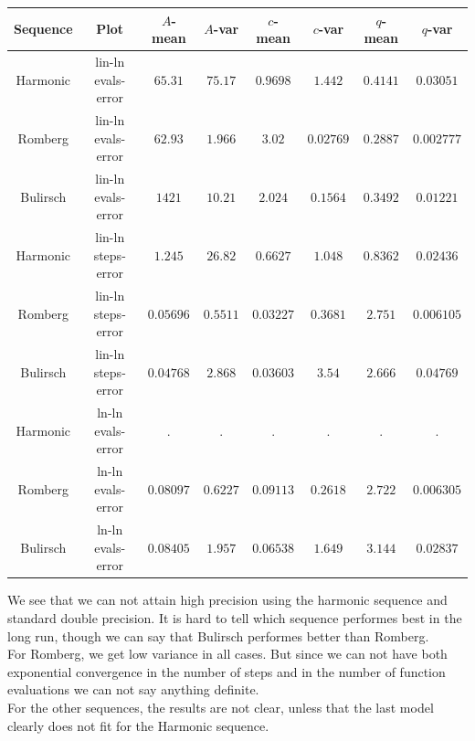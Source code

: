 \begin{table}[H]
    \centering
    \small
    \begin{tabular}{c|c||c|c|c|c|c	|c}
Sequence & Plot & \(A\)-mean & \(A\)-var & \(c\)-mean & \(c\)-var & \(q\)-mean & \(q\)-var\\\hline
Harmonic & lin-ln evals-error & \(65.31\) & \(75.17\) & \(0.9698\) & \(1.442\) & \(0.4141\) & \(0.03051\) \\
Romberg & lin-ln evals-error & \(62.93\) & \(1.966\) & \(3.02\) & \(0.02769\) & \(0.2887\) & \(0.002777\) \\
Bulirsch & lin-ln evals-error & \(1421\) & \(10.21\) & \(2.024\) & \(0.1564\) & \(0.3492\) & \(0.01221\) \\
Harmonic & lin-ln steps-error & \(1.245\) & \(26.82\) & \(0.6627\) & \(1.048\) & \(0.8362\) & \(0.02436\) \\
Romberg & lin-ln steps-error & \(0.05696\) & \(0.5511\) & \(0.03227\) & \(0.3681\) & \(2.751\) & \(0.006105\) \\
Bulirsch & lin-ln steps-error & \(0.04768\) & \(2.868\) & \(0.03603\) & \(3.54\) & \(2.666\) & \(0.04769\) \\
Harmonic & ln-ln evals-error & . & . & . & . & . & . \\
Romberg & ln-ln evals-error & \(0.08097\) & \(0.6227\) & \(0.09113\) & \(0.2618\) & \(2.722\) & \(0.006305\) \\
Bulirsch & ln-ln evals-error & \(0.08405\) & \(1.957\) & \(0.06538\) & \(1.649\) & \(3.144\) & \(0.02837\) \\
    \end{tabular}
    \label{tab:my_label}
\end{table}

We see that we can not attain high precision using the harmonic sequence and standard double precision. It is hard to tell which sequence performes best in the long run, though we can say that Bulirsch performes better than Romberg.\\

For Romberg, we get low variance in all cases. But since we can not have both exponential convergence in the number of steps and in the number of function evaluations we can not say anything definite.\\

For the other sequences, the results are not clear, unless that the last model clearly does not fit for the Harmonic sequence.\\

